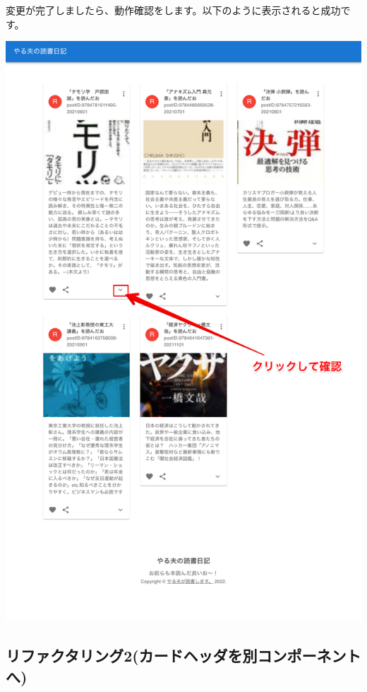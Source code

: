 変更が完了しましたら、動作確認をします。以下のように表示されると成功です。


\clearpage

\begin{reviewimage}%
\includegraphics[width=0.7\maxwidth]{./images/03-todo-with-react/diaryBoad_done.png}%
\label{image:03-todo-with-react:diaryBoad_done}
\end{reviewimage}

\subsection{リファクタリング2(カードヘッダを別コンポーネントへ)}
\keeplastskip{
  \label{sec:3-3-6}
  \label{sec-0336}
  \par\nobreak
}

